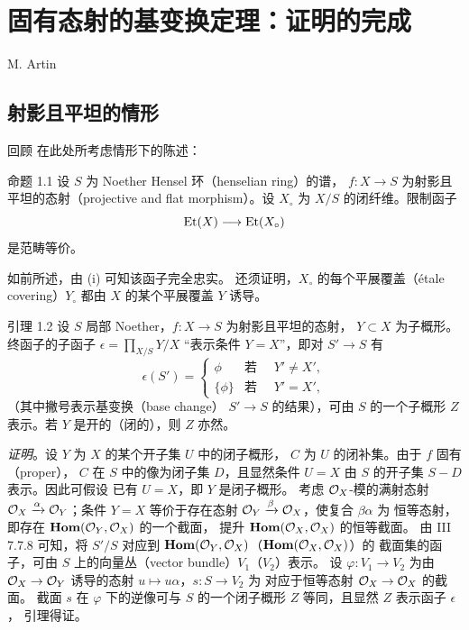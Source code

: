 \chapter{固有态射的基变换定理：证明的完成}
\begin{center}
M. Artin
\end{center}
\label{sga4.exp.XIII}

\setcounter{pageoriginal}{131}

\section{射影且平坦的情形}\pageoriginale

回顾  在此处所考虑情形下的陈述：

\begin{enonce*}{命题 1.1}
设 $S$ 为 Noether Hensel 环（henselian ring）的谱，
$f:X\rightarrow S$ 为射影且平坦的态射（projective and flat morphism）。设 $X_{\circ}$ 为
$X/S$ 的闭纤维。限制函子
$$
\operatorname{Et}(X)\longrightarrow \operatorname{Et}(X_{\circ})
$$
是范畴等价。
\end{enonce*}

如前所述，由  (i) 可知该函子完全忠实。
还须证明，$X_{\circ}$ 的每个平展覆盖（étale covering）$Y_{\circ}$ 都由
$X$ 的某个平展覆盖 $Y$ 诱导。

\begin{enonce*}{引理 1.2}
设 $S$ 局部 Noether，$f:X\rightarrow S$ 为射影且平坦的态射，
$Y\subset X$ 为子概形。终函子的子函子
$\epsilon=\prod_{X/S}Y/X$ 
“表示条件 $Y=X$”，即对 $S'\rightarrow S$ 有
$$
\epsilon(S')=
\begin{cases}
\phi & \mbox{若 }\quad Y'\neq X',\\
\{\phi\} &\mbox{若 }\quad Y'=X',
\end{cases}
$$
（其中\pageoriginale 撇号表示基变换（base change）
$S'\rightarrow S$ 的结果），可由 $S$ 的一个子概形 $Z$ 表示。若
$Y$ 是开的（\resp 闭的），则 $Z$ 亦然。
\end{enonce*}

\noindent
\emph{证明}。设 $Y$ 为 $X$ 的某个开子集 $U$ 中的闭子概形，
$C$ 为 $U$ 的闭补集。由于 $f$ 固有（proper），
$C$ 在 $S$ 中的像为闭子集 $D$，且显然条件
$U=X$ 由 $S$ 的开子集 $S-D$ 表示。因此可假设
已有 $U=X$，即 $Y$ 是闭子概形。
考虑 ${\mathcal O}_X$-模的满射态射
${\mathcal O}_X\xrightarrow{\alpha}{\mathcal O}_Y$；条件 $Y=X$
等价于存在态射
${\mathcal O}_Y\xrightarrow{\beta}{\mathcal O}_X$，使复合 $\beta\alpha$ 为
恒等态射，即存在 $\operatorname{\mathbf{Hom}}({\mathcal O}_Y,{\mathcal O}_X)$ 的一个截面，
提升 $\operatorname{\mathbf{Hom}}({\mathcal O}_X,{\mathcal O}_X)$ 的恒等截面。
由 \EGA III 7.7.8 可知，将 $S'/S$ 对应到
$\operatorname{\mathbf{Hom}}({\mathcal O}_Y,{\mathcal O}_X)$（\resp $\operatorname{\mathbf{Hom}}({\mathcal O}_X,{\mathcal O}_X)$）的
截面集的函子，可由 $S$ 上的向量丛（vector bundle）$V_1$（\resp $V_2$）表示。
设 $\varphi:V_1\rightarrow V_2$ 为由 ${\mathcal O}_X\rightarrow{\mathcal O}_Y$ 诱导的态射
$u\mapsto u\alpha$，$s:S\rightarrow V_2$ 为
对应于恒等态射 ${\mathcal O}_X\rightarrow{\mathcal O}_X$ 的截面。
截面 $s$ 在 $\varphi$ 下的逆像可与 $S$ 的一个闭子概形
$Z$ 等同，且显然 $Z$ 表示函子 $\epsilon$，
引理得证。


